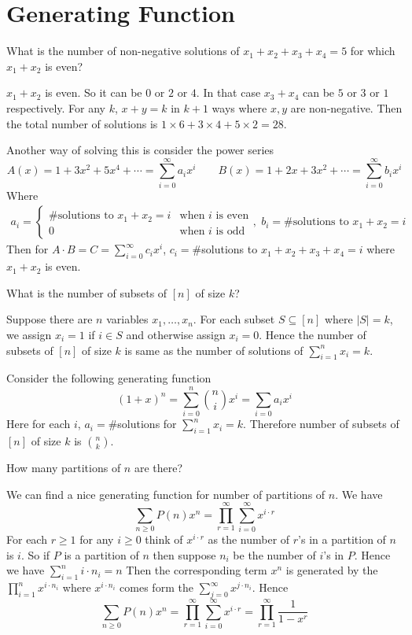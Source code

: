 \section{Generating Function}
\begin{Question}{}{}
	What is the number of non-negative solutions of $x_1+x_2+x_3+x_4=5$ for which $x_1+x_2$ is even?
\end{Question}
\begin{solution}
	$x_1+x_2$ is even. So it can be $0$ or $2$ or $4$. In that case $x_3+x_4$ can be $5$ or $3$ or $1$ respectively. For any $k$, $x+y=k$  in $k+1$ ways where $x,y$ are non-negative. Then the total number of solutions is $1\times 6+3\times 4+5\times 2=28$.
	
	Another way of solving this is consider the power series $$A(x)=1+3x^2+5x^4+\cdots=\sum_{i=0}^{\infty}a_ix^i\qquad B(x)=1+2x+3x^2+\cdots=\sum_{i=0}^{\infty}b_ix^i$$Where \begin{align*}
		a_i=\begin{cases}
			\#\text{solutions to $x_1+x_2=i$}& \text{when $i$ is even}\\
			0 & \text{when $i$ is odd}
		\end{cases},  &&  b_i=		\#\text{solutions to $x_1+x_2=i$}
	\end{align*}
Then for $A\cdot B=C=\sum\limits_{i=0}^{\infty}c_ix^i$, $c_i=\#$solutions to $x_1+x_2+x_3+x_4=i$ where $x_1+x_2$ is even.
\end{solution}
\begin{Question}{}{}
	What is the number of subsets of $[n]$ of size $k$?
\end{Question}
\begin{solution}
	Suppose there are $n$ variables $x_1,\dots, x_n$. For each subset $S\subseteq [n]$ where $|S|=k$, we assign $x_i=1$ if $i\in S$ and otherwise assign $x_i=0$. Hence the number of subsets of $[n]$ of size $k$ is same as the number of solutions of $\sum\limits_{i=1}^nx_i=k$. 
	
	Consider the following generating function $$(1+x)^n=\sum_{i=0}^n \binom{n}ix^i=\sum_{i=0}a_ix^i$$Here for each $i$, $a_i=\#$solutions for $\sum\limits_{i=1}^nx_i=k$. Therefore number of subsets of $[n]$ of size $k$ is $\binom{n}k$. 
\end{solution}
\begin{Question}{}{}
	How many partitions of $n$ are there?
\end{Question}
\begin{solution}
	We can find a nice generating function for number of partitions of $n$. We have $$\sum_{n\geq 0}P(n)x^n=\prod_{r=1}^{\infty}\sum_{i=0}^{\infty}x^{i\cdot r}$$For each $r\geq 1$ for any $i\geq 0$ think of $x^{i\cdot r}$ as the number of $r$'s in a partition of $n$ is $i$. So if $P$ is a partition of $n$ then suppose $n_i$ be the number of $i$'s in $P$. Hence we have $\sum\limits_{i=1}^ni\cdot n_i=n$ Then the corresponding term $x^n$ is generated by the $\prod\limits_{i=1}^nx^{i\cdot n_i}$ where $x^{i\cdot n_i}$ comes form the $\sum\limits_{j=0}^{\infty}x^{j\cdot n_i}$. Hence $$\sum_{n\geq 0}P(n)x^n=\prod_{r=1}^{\infty}\sum_{i=0}^{\infty}x^{i\cdot r}=\prod_{r=1}^{\infty}\frac1{1-x^r}$$
\end{solution}
